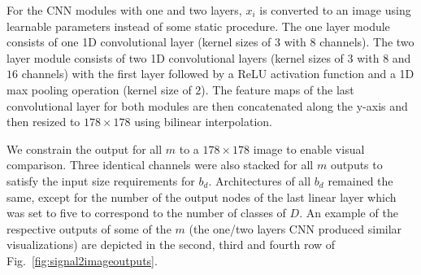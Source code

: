 \documentclass[conference]{IEEEtran}
\begin{document}
For the CNN modules with one and two layers, $x_i$ is converted to an image using learnable parameters instead of some static procedure.
The one layer module consists of one 1D convolutional layer (kernel sizes of $3$ with $8$ channels).
The two layer module consists of two 1D convolutional layers (kernel sizes of $3$ with $8$ and $16$ channels) with the first layer followed by a ReLU activation function and a 1D max pooling operation (kernel size of $2$).
The feature maps of the last convolutional layer for both modules are then concatenated along the y-axis and then resized to $178\times 178$ using bilinear interpolation.

We constrain the output for all $m$ to a $178\times 178$ image to enable visual comparison.
Three identical channels were also stacked for all $m$ outputs to satisfy the input size requirements for $b_d$.
Architectures of all $b_d$ remained the same, except for the number of the output nodes of the last linear layer which was set to five to correspond to the number of classes of $D$.
An example of the respective outputs of some of the $m$ (the one/two layers CNN produced similar visualizations) are depicted in the second, third and fourth row of Fig.~\ref{fig:signal2imageoutputs}.
\end{document}
